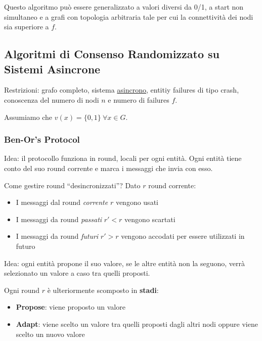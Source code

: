 Questo algoritmo può essere generalizzato a valori diversi da 0/1, a start non simultaneo e a grafi con topologia arbitraria
tale per cui la connettività dei nodi sia superiore a $f$.

\subsection{Algoritmi di Consenso Randomizzato su Sistemi Asincrone}

Restrizioni: grafo completo, sistema \underline{asincrono}, entitiy failures di tipo crash, conoscenza del numero di nodi $n$ e numero di failures $f$.


Assumiamo che $v(x) = \{0, 1\} \ \forall x \in G$.

\subsubsection{Ben-Or's Protocol}
Idea: il protocollo funziona in round, locali per ogni entità. Ogni entità tiene conto del suo round corrente e marca i messaggi che invia con esso.

Come gestire round ``desincronizzati''? Dato $r$ round corrente:\\
\begin{itemize}
  \item I messaggi dal round \textit{corrente} $r$ vengono usati
  \item I messaggi da round \textit{passati} $r' < r$ vengono scartati
  \item I messaggi da round \textit{futuri} $r' > r$ vengono accodati per essere utilizzati in futuro
\end{itemize}

Idea: ogni entità propone il suo valore, se le altre entità non la seguono, verrà selezionato un valore a caso tra quelli proposti.

Ogni round $r$ è ulteriormente scomposto in \textbf{stadi}:
\begin{itemize}
  \item \textbf{Propose}: viene proposto un valore
  \item \textbf{Adapt}: viene scelto un valore tra quelli proposti dagli altri nodi oppure viene scelto un nuovo valore
\end{itemize}
 

